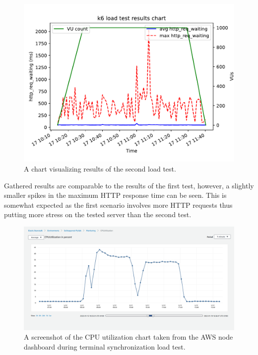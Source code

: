 \documentclass[12pt, a4paper]{article}
\begin{document}
\begin{figure}[!ht]
    \centering 
    \includegraphics[width=1\textwidth]{pdf/avg-waiting-time-2.pdf}
    \caption{A chart visualizing results of the second load test.}
    \label{fig:waiting-time-2}
\end{figure}

Gathered results are comparable to the results of the first test, however, a slightly smaller spikes in the maximum HTTP response time can be seen.
This is somewhat expected as the first scenario involves more HTTP requests thus putting more stress on the tested server than the second test.

\begin{figure}[!ht]
    \centering 
    \includegraphics[width=1\textwidth]{img/node-cpu-usage.png}
    \caption{A screenshot of the CPU utilization chart taken from the AWS node dashboard during terminal synchronization load test.}
    \label{fig:cpu-usage-1}
\end{figure}
\end{document}
